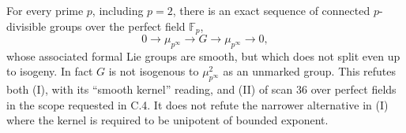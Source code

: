 \begin{proposition}
\label{C:formal_Frobenius_counterexample}
For every prime $p$, including $p=2$, there is an exact sequence of connected
$p$-divisible groups over the perfect field $\mathbb F_p$,
\[
 0\longrightarrow\mu_{p^\infty}\longrightarrow G
       \longrightarrow\mu_{p^\infty}\longrightarrow0,          \tag{C.4.2}
\]
whose associated formal Lie groups are smooth, but which does not split
even up to isogeny. In fact $G$ is not isogenous to
$\mu_{p^\infty}^2$ as an unmarked group. This refutes both (I), with its
``smooth kernel'' reading, and (II) of scan 36 over perfect fields in the
scope requested in C.4. It does not refute the narrower alternative in (I)
where the kernel is required to be unipotent of bounded exponent.
\end{proposition}
